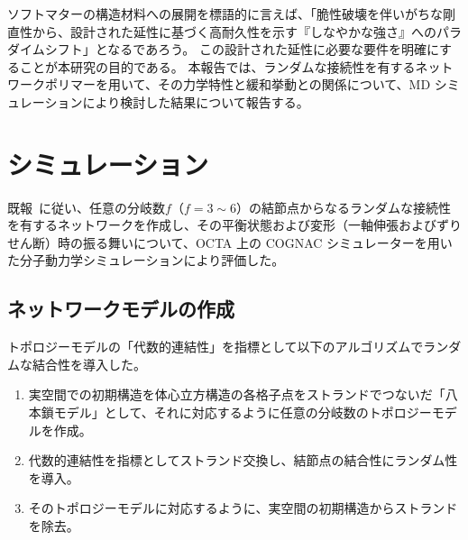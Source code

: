 \documentclass[uplatex,10pt,a4paper,twocolumn]{jsarticle}
\begin{document}




ソフトマターの構造材料への展開を標語的に言えば、「脆性破壊を伴いがちな剛直性から、設計された延性に基づく高耐久性を示す『しなやかな強さ』へのパラダイムシフト」となるであろう。
この設計された延性に必要な要件を明確にすることが本研究の目的である。
本報告では、ランダムな接続性を有するネットワークポリマーを用いて、その力学特性と緩和挙動との関係について、MD シミュレーションにより検討した結果について報告する。




\section{シミュレーション}
既報~\cite{sasaki}に従い、任意の分岐数$f$（$f=3\sim6$）の結節点からなるランダムな接続性を有するネットワークを作成し、その平衡状態および変形（一軸伸張およびずりせん断）時の振る舞いについて、OCTA 上の COGNAC シミュレーターを用いた分子動力学シミュレーションにより評価した。

\subsection{ネットワークモデルの作成}
トポロジーモデルの「代数的連結性」を指標として以下のアルゴリズムでランダムな結合性を導入した。
\begin{enumerate}
\item
実空間での初期構造を体心立方構造の各格子点をストランドでつないだ「八本鎖モデル」として、それに対応するように任意の分岐数のトポロジーモデルを作成。
\item
代数的連結性を指標としてストランド交換し、結節点の結合性にランダム性を導入。
\item
そのトポロジーモデルに対応するように、実空間の初期構造からストランドを除去。
\end{enumerate}

\end{document}
